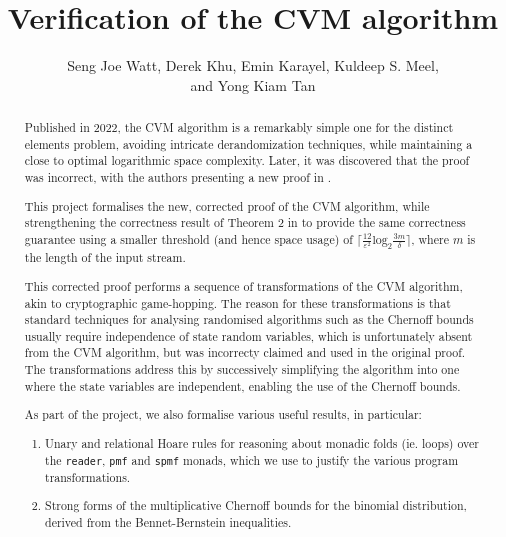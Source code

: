 \documentclass[11pt, a4paper]{report}
\begin{document}
\title{Verification of the CVM algorithm}

\author{
  Seng Joe Watt,
  Derek Khu,
  Emin Karayel,
  Kuldeep S. Meel,
  \\
  and Yong Kiam Tan
}

\maketitle

\begin{abstract}
  Published in 2022, the CVM algorithm \cite{cvm_2022} is a remarkably simple
  one for the distinct elements problem, avoiding intricate derandomization
  techniques, while maintaining a close to optimal logarithmic space complexity.
  Later, it was discovered that the proof was incorrect, with the authors
  presenting a new proof in \cite{cvm_2023}.

  This project formalises the new, corrected proof of the CVM algorithm, while
  strengthening the correctness result of Theorem 2 in \cite{cvm_2023} to provide
  the same correctness guarantee using a smaller threshold
  (and hence space usage) of
  $\lceil \frac{12}{\varepsilon^2} \text{log}_2 \frac{3m}{\delta} \rceil$,
  where $m$ is the length of the input stream.

  This corrected proof performs a sequence of transformations of the CVM
  algorithm, akin to cryptographic game-hopping.
  The reason for these transformations is that standard techniques for analysing
  randomised algorithms such as the Chernoff bounds usually require independence
  of state random variables, which is unfortunately absent from the CVM
  algorithm, but was incorrecty claimed and used in the original proof.
  The transformations address this by successively simplifying the
  algorithm into one where the state variables are independent, enabling
  the use of the Chernoff bounds.

  As part of the project, we also formalise various useful results, in particular:
  \begin{enumerate}
    \item Unary and relational Hoare rules for reasoning about monadic folds
    (ie. loops) over the \texttt{reader}, \texttt{pmf} and \texttt{spmf} monads,
    which we use to justify the various program transformations.

    \item Strong forms of the multiplicative Chernoff bounds for the binomial
    distribution, derived from the Bennet-Bernstein inequalities.
  \end{enumerate}
\end{abstract}
\end{document}
